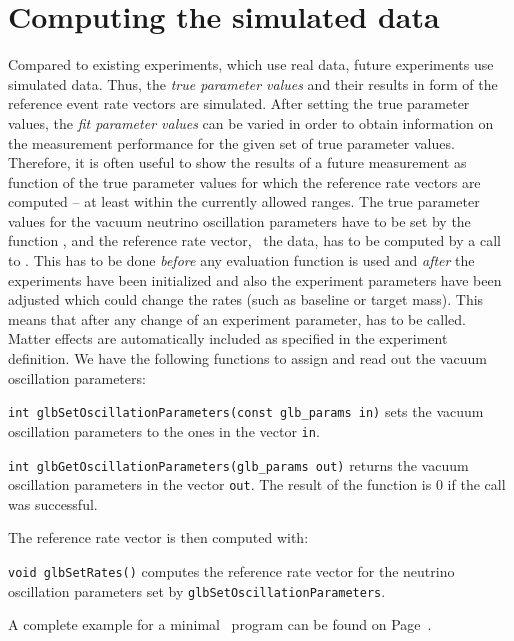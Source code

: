 \section{Computing the simulated data}

Compared to existing experiments, which use real data, future experiments
use simulated data. Thus, the {\em true parameter values} and their results in 
form of the reference event rate vectors are simulated. After setting the 
true parameter values, the {\em fit parameter values} can be varied in order to 
obtain information on the measurement performance for the given set of true 
parameter values. Therefore, it is often useful to show the results of a 
future measurement as function of the true parameter values for which the 
reference rate vectors are computed -- at least within the currently allowed 
ranges. The true parameter values for the vacuum neutrino oscillation 
parameters have to be set by the function , 
and the reference rate vector, \ie\ the data, has to be computed by a call 
to .
This has to be done {\em before} any evaluation 
function is used and  {\em after} the experiments have been initialized and 
also the experiment 
parameters have been adjusted which could change the rates (such as baseline
 or target mass). This means that
after any change of an experiment parameter,  has to be 
called. Matter effects are automatically included as specified in the 
experiment definition. We have the following functions to assign and
read out the vacuum oscillation parameters:
\begin{function}
{\tt int glbSetOscillationParameters(const glb\_params in)} sets the
vacuum oscillation parameters to the ones in the vector {\tt in}.
\end{function}
\begin{function}
{\tt int glbGetOscillationParameters(glb\_params out)} returns the
vacuum oscillation parameters in the vector {\tt out}. The result of
the function is $0$ if the call was successful.
\end{function}
The reference rate vector is then computed with:
\begin{function}
{\tt void glbSetRates()} computes the reference rate vector for the neutrino oscillation parameters set by {\tt glbSetOscillationParameters}. 
\end{function}
A complete example for a minimal \GLOBES\ program can be found on
Page~\pageref{ex:c}.

